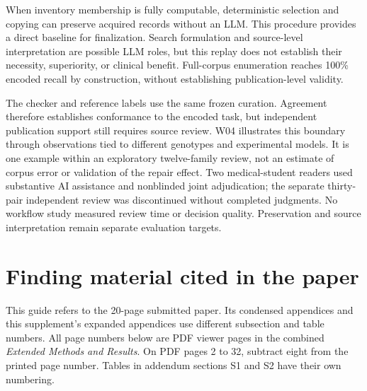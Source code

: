 \documentclass[11pt]{article}
\begin{document}
When inventory membership is fully computable, deterministic selection and
copying can preserve acquired records without an LLM. This procedure provides a
direct baseline for finalization. Search formulation and source-level
interpretation are possible LLM roles, but this replay does not establish their
necessity, superiority, or clinical benefit. Full-corpus enumeration reaches
100\% encoded recall by construction, without establishing publication-level
validity.

The checker and reference labels use the same frozen curation. Agreement
therefore establishes conformance to the encoded task, but independent
publication support still requires source review. W04 illustrates this boundary
through observations tied to different genotypes and experimental models. It is
one example within an exploratory twelve-family review, not an estimate of
corpus error or validation of the repair effect. Two medical-student readers
used substantive AI assistance and nonblinded joint adjudication; the separate
thirty-pair independent review was discontinued without completed judgments. No
workflow study measured review time or decision quality. Preservation and source
interpretation remain separate evaluation targets.

\clearpage
\section{Finding material cited in the paper}

This guide refers to the 20-page submitted paper. Its condensed appendices and
this supplement's expanded appendices use different subsection and table
numbers. All page numbers below are PDF viewer pages in the combined
\emph{Extended Methods and Results}. On PDF pages 2 to 32, subtract eight from
the printed page number. Tables in addendum sections S1 and S2 have their own
numbering.
\end{document}
